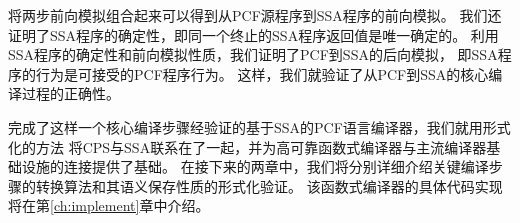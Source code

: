 将两步前向模拟组合起来可以得到从PCF源程序到SSA程序的前向模拟。
我们还证明了SSA程序的确定性，即同一个终止的SSA程序返回值是唯一确定的。
利用SSA程序的确定性和前向模拟性质，我们证明了PCF到SSA的后向模拟，
即SSA程序的行为是可接受的PCF程序行为。
这样，我们就验证了从PCF到SSA的核心编译过程的正确性。

完成了这样一个核心编译步骤经验证的基于SSA的PCF语言编译器，我们就用形式化的方法
将CPS与SSA联系在了一起，并为高可靠函数式编译器与主流编译器基础设施的连接提供了基础。
在接下来的两章中，我们将分别详细介绍关键编译步骤的转换算法和其语义保存性质的形式化验证。
该函数式编译器的具体代码实现将在第\ref{ch:implement}章中介绍。